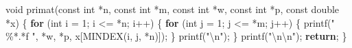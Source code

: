 \documentclass[
  12pt,
  letterpaper,
  DIV=11,
  numbers=noendperiod]{scrreprt}
\newenvironment{Shaded}{\begin{snugshade}}{\end{snugshade}}
\newcommand{\ControlFlowTok}[1]{\textcolor[rgb]{0.00,0.23,0.31}{\textbf{#1}}}
\newcommand{\DataTypeTok}[1]{\textcolor[rgb]{0.68,0.00,0.00}{#1}}
\newcommand{\DecValTok}[1]{\textcolor[rgb]{0.68,0.00,0.00}{#1}}
\newcommand{\NormalTok}[1]{\textcolor[rgb]{0.00,0.23,0.31}{#1}}
\newcommand{\OperatorTok}[1]{\textcolor[rgb]{0.37,0.37,0.37}{#1}}
\newcommand{\SpecialCharTok}[1]{\textcolor[rgb]{0.37,0.37,0.37}{#1}}
\newcommand{\StringTok}[1]{\textcolor[rgb]{0.13,0.47,0.30}{#1}}
\theoremstyle{remark}
\begin{document}
\begin{Shaded}
\begin{Highlighting}[]
\DataTypeTok{void}\NormalTok{ primat}\OperatorTok{(}\DataTypeTok{const} \DataTypeTok{int} \OperatorTok{*}\NormalTok{n}\OperatorTok{,} \DataTypeTok{const} \DataTypeTok{int} \OperatorTok{*}\NormalTok{m}\OperatorTok{,} \DataTypeTok{const} \DataTypeTok{int} \OperatorTok{*}\NormalTok{w}\OperatorTok{,} \DataTypeTok{const} \DataTypeTok{int} \OperatorTok{*}\NormalTok{p}\OperatorTok{,}
            \DataTypeTok{const} \DataTypeTok{double} \OperatorTok{*}\NormalTok{x}\OperatorTok{)} \OperatorTok{\{}
    \ControlFlowTok{for} \OperatorTok{(}\DataTypeTok{int}\NormalTok{ i }\OperatorTok{=} \DecValTok{1}\OperatorTok{;}\NormalTok{ i }\OperatorTok{\textless{}=} \OperatorTok{*}\NormalTok{n}\OperatorTok{;}\NormalTok{ i}\OperatorTok{++)} \OperatorTok{\{}
        \ControlFlowTok{for} \OperatorTok{(}\DataTypeTok{int}\NormalTok{ j }\OperatorTok{=} \DecValTok{1}\OperatorTok{;}\NormalTok{ j }\OperatorTok{\textless{}=} \OperatorTok{*}\NormalTok{m}\OperatorTok{;}\NormalTok{ j}\OperatorTok{++)} \OperatorTok{\{}
\NormalTok{            printf}\OperatorTok{(}\StringTok{" }\SpecialCharTok{\%*.*f}\StringTok{ "}\OperatorTok{,} \OperatorTok{*}\NormalTok{w}\OperatorTok{,} \OperatorTok{*}\NormalTok{p}\OperatorTok{,}\NormalTok{ x}\OperatorTok{[}\NormalTok{MINDEX}\OperatorTok{(}\NormalTok{i}\OperatorTok{,}\NormalTok{ j}\OperatorTok{,} \OperatorTok{*}\NormalTok{n}\OperatorTok{)]);}
        \OperatorTok{\}}
\NormalTok{        printf}\OperatorTok{(}\StringTok{"}\SpecialCharTok{\textbackslash{}n}\StringTok{"}\OperatorTok{);}
    \OperatorTok{\}}
\NormalTok{    printf}\OperatorTok{(}\StringTok{"}\SpecialCharTok{\textbackslash{}n\textbackslash{}n}\StringTok{"}\OperatorTok{);}
    \ControlFlowTok{return}\OperatorTok{;}
\OperatorTok{\}}


\end{Highlighting}
\end{Shaded}
\end{document}
